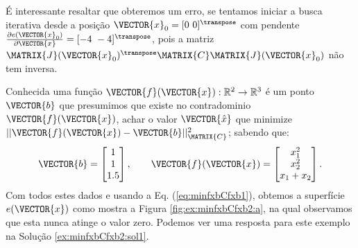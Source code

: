 \begin{SolutionT}
\label{ex:minfxbCfxb:sol2}
É interessante resaltar que obteremos um erro,
se tentamos iniciar a busca iterativa desde a posição  $\VECTOR{x}_0=[0~0]^{\transpose}$
com pendente $\frac{\partial e(\VECTOR{x}_0)}{\partial \VECTOR{x} }=[-4~-4]^{\transpose}$,
pois a matriz $\MATRIX{J}(\VECTOR{x}_0)^{\transpose}\MATRIX{C} \MATRIX{J}(\VECTOR{x}_0)$
não tem inversa.
\end{SolutionT}


\begin{example}
\label{ex:minfxbCfxb2}
Conhecida uma função $\VECTOR{f}(\VECTOR{x}) : \mathbb{R}^{2} \rightarrow \mathbb{R}^{3}$
é um ponto $\VECTOR{b}$ que presumimos que existe no contradominio $\VECTOR{f}(\VECTOR{x})$,
achar o valor $\VECTOR{\hat{x}}$ que minimize $||\VECTOR{f}(\VECTOR{x})-\VECTOR{b}||_{\MATRIX{C}}^2$;
sabendo que:
\begin{equation}
\VECTOR{b}=\begin{bmatrix}
1\\
1\\
1.5
\end{bmatrix},
\qquad 
\VECTOR{f}(\VECTOR{x})=\begin{bmatrix}
x_1^2\\
x_2^2\\
x_1+x_2
\end{bmatrix}.
\end{equation}
Com todos estes dados e usando a Eq. (\ref{eq:minfxbCfxb1}),
obtemos a superfície $e(\VECTOR{x})$ como mostra a Figura \ref{fig:ex:minfxbCfxb2:a},
na qual observamos que esta nunca atinge o valor zero.
Podemos ver uma resposta para este exemplo na Solução \ref{ex:minfxbCfxb2:sol1}.
\end{example}

